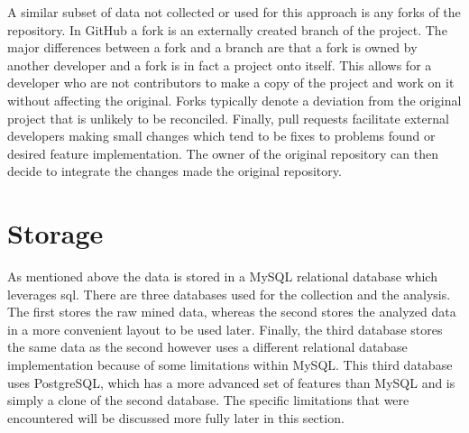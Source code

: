 A similar subset of data not collected or used for this approach is any forks of the repository. In GitHub a fork is an externally created branch of the project. The major differences between a fork and a branch are that a fork is owned by another developer and a fork is in fact a project onto itself. This allows for a developer who are not contributors to make a copy of the project and work on it without affecting the original. Forks typically denote a deviation from the original project that is unlikely to be reconciled. Finally, pull requests facilitate external developers making small changes which tend to be fixes to problems found or desired feature implementation. The owner of the original repository can then decide to integrate the changes made the original repository.



\section{Storage}
\label{sec:storage}

As mentioned above the data is stored in a MySQL relational database which leverages \gls{sql}. There are three databases used for the collection and the analysis. The first stores the raw mined data, whereas the second stores the analyzed data in a more convenient layout to be used later. Finally, the third database stores the same data as the second however uses a different relational database implementation because of some limitations within MySQL. This third database uses PostgreSQL, which has a more advanced set of features than MySQL and is simply a clone of the second database. The specific limitations that were encountered will be discussed more fully later in this section.

